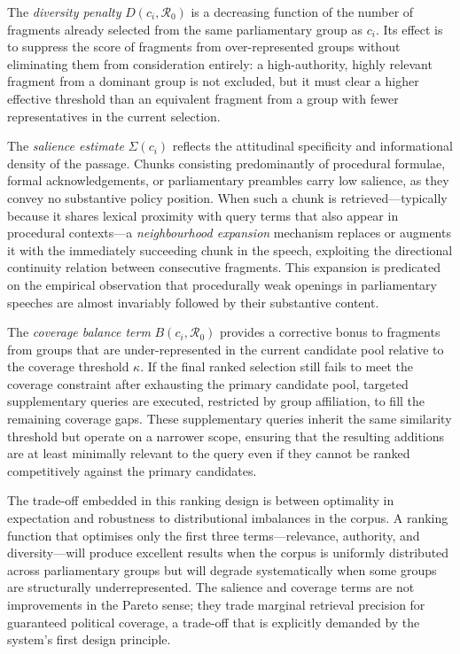 The \textit{diversity penalty} $D(c_i, \mathcal{R}_0)$ is a decreasing function of the number
of fragments already selected from the same parliamentary group as $c_i$. Its effect is to
suppress the score of fragments from over-represented groups without eliminating them from
consideration entirely: a high-authority, highly relevant fragment from a dominant group is not
excluded, but it must clear a higher effective threshold than an equivalent fragment from a
group with fewer representatives in the current selection.

The \textit{salience estimate} $\Sigma(c_i)$ reflects the attitudinal specificity and
informational density of the passage. Chunks consisting predominantly of procedural formulae,
formal acknowledgements, or parliamentary preambles carry low salience, as they convey no
substantive policy position. When such a chunk is retrieved---typically because it shares
lexical proximity with query terms that also appear in procedural contexts---a
\textit{neighbourhood expansion} mechanism replaces or augments it with the immediately succeeding
chunk in the speech, exploiting the directional continuity relation between consecutive
fragments. This expansion is predicated on the empirical observation that procedurally weak
openings in parliamentary speeches are almost invariably followed by their substantive content.

The \textit{coverage balance term} $B(c_i, \mathcal{R}_0)$ provides a corrective bonus to
fragments from groups that are under-represented in the current candidate pool relative to the
coverage threshold $\kappa$. If the final ranked selection still fails to meet the coverage
constraint after exhausting the primary candidate pool, targeted supplementary queries are
executed, restricted by group affiliation, to fill the remaining coverage gaps. These
supplementary queries inherit the same similarity threshold but operate on a narrower scope,
ensuring that the resulting additions are at least minimally relevant to the query even if they
cannot be ranked competitively against the primary candidates.

The trade-off embedded in this ranking design is between optimality in expectation and robustness
to distributional imbalances in the corpus. A ranking function that optimises only the first
three terms---relevance, authority, and diversity---will produce excellent results when the corpus
is uniformly distributed across parliamentary groups but will degrade systematically when some
groups are structurally underrepresented. The salience and coverage terms are not improvements
in the Pareto sense; they trade marginal retrieval precision for guaranteed political coverage,
a trade-off that is explicitly demanded by the system's first design principle.


